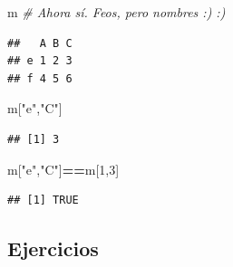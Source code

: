 \documentclass[
]{book}
\newenvironment{Shaded}{\begin{snugshade}}{\end{snugshade}}
\newcommand{\CommentTok}[1]{\textcolor[rgb]{0.56,0.35,0.01}{\textit{#1}}}
\newcommand{\DecValTok}[1]{\textcolor[rgb]{0.00,0.00,0.81}{#1}}
\newcommand{\NormalTok}[1]{#1}
\newcommand{\SpecialCharTok}[1]{\textcolor[rgb]{0.81,0.36,0.00}{\textbf{#1}}}
\newcommand{\StringTok}[1]{\textcolor[rgb]{0.31,0.60,0.02}{#1}}
\begin{document}
\begin{Shaded}
\begin{Highlighting}[]
\NormalTok{m   }\CommentTok{\# Ahora sí. Feos, pero nombres :) :)}
\end{Highlighting}
\end{Shaded}

\begin{verbatim}
##   A B C
## e 1 2 3
## f 4 5 6
\end{verbatim}

\begin{Shaded}
\begin{Highlighting}[]
\NormalTok{m[}\StringTok{"e"}\NormalTok{,}\StringTok{"C"}\NormalTok{]}
\end{Highlighting}
\end{Shaded}

\begin{verbatim}
## [1] 3
\end{verbatim}

\begin{Shaded}
\begin{Highlighting}[]
\NormalTok{m[}\StringTok{"e"}\NormalTok{,}\StringTok{"C"}\NormalTok{]}\SpecialCharTok{==}\NormalTok{m[}\DecValTok{1}\NormalTok{,}\DecValTok{3}\NormalTok{]}
\end{Highlighting}
\end{Shaded}

\begin{verbatim}
## [1] TRUE
\end{verbatim}

\subsection{Ejercicios}\label{ejercicios}
\end{document}
